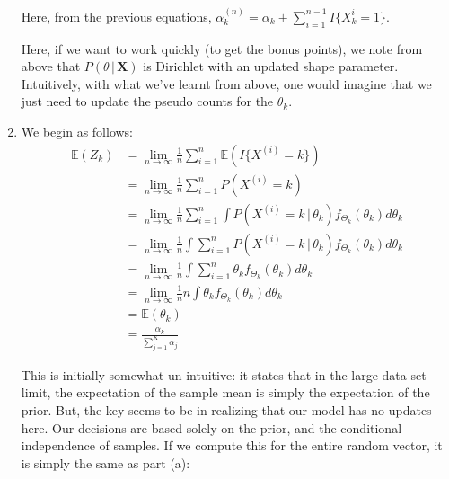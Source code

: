 \documentclass[submit]{harvardml}
\newcommand{\given}{\,|\,}
\newcommand{\E}{\mathbb{E}}
\newcommand{\Dir}{\text{Dirichlet}}
\renewcommand{\v}{\boldsymbol}
\begin{document}
\begin{enumerate}[label=(\alph*)]
		Here, from the previous equations, $\alpha^{(n)}_k = \alpha_k + \sum_{i=1}^{n-1} I\{X^{i}_k =1 \}$.
		
		 Here, if we want to work quickly (to get the bonus points), we note from above that $P(\theta \given \v{X})$ is $\Dir$ with an updated shape parameter. Intuitively, with what we've learnt from above, one would imagine that we just need to update the pseudo counts for the $\theta_k$. 
		\item
			We begin as follows:
			\begin{align*}
				\E(Z_k) &= \lim_{n\rightarrow \infty} \frac{1}{n}\sum_{i=1}^{n} \E(I\{X^{(i)} = k \}) \\
				&= \lim_{n\rightarrow \infty} \frac{1}{n} \sum_{i=1}^{n} P(X^{(i)} = k)  \\
				&= \lim_{n\rightarrow \infty} \frac{1}{n} \sum_{i=1}^{n} \int P(X^{(i)} = k \given \theta_k) f_{\Theta_k} (\theta_k) d\theta_k \\
				&= \lim_{n\rightarrow \infty} \frac{1}{n}  \int \sum_{i=1}^{n} P(X^{(i)} = k \given \theta_k) f_{\Theta_k} (\theta_k) d\theta_k  \\
				&= \lim_{n\rightarrow \infty} \frac{1}{n}  \int \sum_{i=1}^{n} \theta_k f_{\Theta_k} (\theta_k) d\theta_k \\
				&= \lim_{n\rightarrow \infty} \frac{1}{n} n \int \theta_k f_{\Theta_k} (\theta_k) d\theta_k \\
				&= \E(\theta_k) \\
				&= \frac{\alpha_k}{\sum_{j=1}^K \alpha_j}
			\end{align*}
			
			This is initially somewhat un-intuitive: it states that in the large data-set limit, the expectation of the sample mean is simply the expectation of the prior. But, the key seems to be in realizing that our model has no updates here. Our decisions are based solely on the prior, and the conditional independence of samples. If we compute this for the entire random vector, it is simply the same as part (a):


\end{enumerate}
\end{document}
